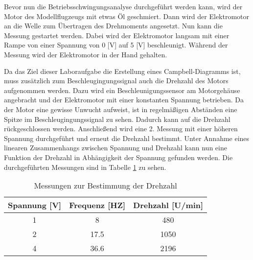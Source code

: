     \noindent
    Bevor nun die Betriebsschwingungsanalyse durchgeführt werden kann, wird der
    Motor des Modellflugzeugs mit etwas Öl geschmiert. Dann wird der Elektromotor
    an die Welle zum Übertragen des Drehmoments angesetzt. Nun kann die Messung
    gestartet werden. Dabei wird der Elektromotor langsam mit einer Rampe von einer
    Spannung von 0 [V] auf 5 [V] beschleunigt. Während der Messung wird der
    Elektromotor in der Hand gehalten.

    \noindent
    Da das Ziel dieser Laboraufgabe die Erstellung eines Campbell-Diagramms ist,
    muss zusätzlich zum Beschleugingungssignal auch die Drehzahl des Motors
    aufgenommen werden. Dazu wird ein Beschleunigungssensor am Motorgehäuse
    angebracht und der Elektromotor mit einer konstanten Spannung betrieben. Da
    der Motor eine gewisse Unwucht aufweist, ist in regelmäßigen Abständen eine
    Spitze im Beschleugingungssignal zu sehen. Dadurch kann auf die Drehzahl
    rückgeschlossen werden. Anschließend wird eine 2. Messung mit einer höheren
    Spannung durchgeführt und erneut die Drehzahl bestimmt. Unter Annahme eines
    linearen Zusammenhangs zwischen Spannung und Drehzahl kann nun eine Funktion
    der Drehzahl in Abhängigkeit der Spannung gefunden werden. Die durchgeführten
    Messungen sind in Tabelle \ref{tab: Drehzahlmessung} zu sehen.

    \begin{table}[H]
        \centering
        \begin{tabular}{|c|c|c|}
            \hline
            \textbf{Spannung [V]} & \textbf{Frequenz [HZ]} & \textbf{Drehzahl [U/min]} \\
            \hline \hline
            1   &   8   &   480 \\
            \hline
            2   &   17.5    &   1050 \\
            \hline
            4   &   36.6    &   2196 \\
            \hline
        \end{tabular}
        \caption{Messungen zur Bestimmung der Drehzahl}
        \label{tab: Drehzahlmessung}
    \end{table}

